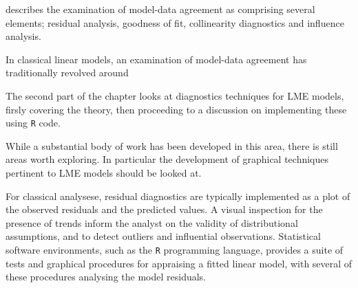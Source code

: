 \documentclass[12pt, a4paper]{report}
\theoremstyle{plain}
\theoremstyle{definition}
\theoremstyle{remark}
\begin{document}
\citet{schabenberger} describes the examination of model-data agreement as comprising several elements; residual analysis, goodness of fit, collinearity diagnostics and influence analysis.
			
			
In classical linear models, an examination of model-data agreement has traditionally revolved around
		\bigskip
			
			The second part of the chapter looks at diagnostics techniques for LME models, firsly covering the theory, then proceeding to a discussion on 
			implementing these using \texttt{R} code.
			
			While a substantial body of work has been developed in this area, there is still areas worth exploring. 
			In particular the development of graphical techniques pertinent to LME models should be looked at.
			
For classical analysese, residual diagnostics are typically implemented as a plot of the observed residuals and the predicted values. A visual inspection for the presence of trends inform the analyst on the validity of distributional assumptions, and to detect outliers and influential observations. Statistical software environments, such as the \texttt{R} programming language, provides a suite of tests and graphical procedures for appraising a fitted linear model, with several of these procedures analysing the model residuals.
		
	
	
	
	
	
\end{document}

